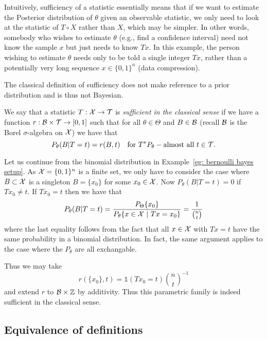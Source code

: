 \documentclass[twoside, a4paper, 10pt]{amsart}
\begin{document}
\begin{remark} Intuitively, sufficiency of a statistic essentially means that if we want to estimate the Posterior distribution of $\theta$ given an observable statistic, we only need to look at the statistic of $T \circ X$ rather than $X$, which may be simpler. In other words, somebody who wishes to estimate $\theta$ (e.g., find a confidence interval) need not know the sample $x$ but just needs to know $Tx$. In this example, the person wishing to estimate $\theta$ needs only to be told a single integer $Tx$, rather than a potentially very long sequence $x \in \{0,1\}^n$ (data compression). 
\end{remark}

The classical definition of sufficiency does not make reference to a prior distribution and is thus not Bayesian.

\begin{mydef} We say that a statistic $T:\mathcal{X} \to \mathcal{T}$ is \textit{sufficient in the classical sense} if we have a function $r:\mathcal{B} \times \mathcal{T} \to [0,1]$ such that for all $\theta \in \Theta$ and $B \in \mathcal{B}$ (recall $\mathcal{B}$ is the Borel $\sigma$-algebra on $\mathcal{X}$) we have that $$P_{\theta}(B | T=t) = r(B,t) \quad \text{for } T^*P_{\theta}-\text{almost all } t \in \mathcal{T}.$$

\end{mydef}

\begin{eg} Let us continue from the binomial distribution in Example~\ref{eg: bernoulli bayes setup}. As $\mathcal{X} = \{0,1\}^n$ is a finite set, we only have to consider the case where $B \subset \mathcal{X}$ is a singleton $B=\{x_0\}$ for some $x_0 \in \mathcal{X}$. Now $P_{\theta}(B | T=t) = 0$ if $Tx_0 \neq t$. If $Tx_0 = t$ then we have that $$P_{\theta}(B | T=t) = \frac{P_{\Theta}\{x_0\}}{P_{\theta}\{x \in \mathcal{X} ~|~ Tx = x_0\}} = \frac{1}{\binom{n}{t}}$$ where the last equality follows from the fact that all $x \in \mathcal{X}$ with $Tx=t$ have the same probability in a binomial distribution. In fact, the same argument applies to the case where the $P_{\theta}$ are all exchangable. 

Thus we may take $$r(\{x_0\},t) = \mathds{1}(Tx_0 = t) \binom{n}{t}^{-1}$$ and extend $r$ to $\mathcal{B} \times \mathbb{Z}$ by additivity. Thus this parametric family is indeed sufficient in the classical sense. 

\end{eg}

\subsection{Equivalence of definitions}
\end{document}
